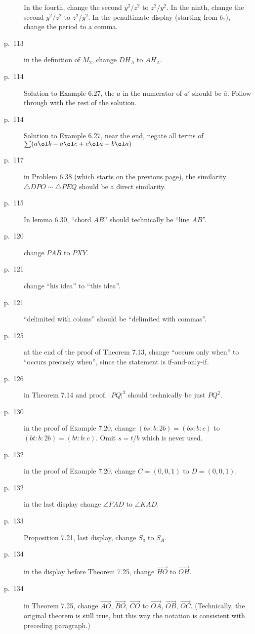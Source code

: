 \documentclass[11pt]{scrartcl}
\begin{document}
\begin{description}
  In the fourth, change the second $y^2/z^2$ to $z^2/y^2$.
  In the ninth, change the second $y^2/z^2$ to $z^2/y^2$.
  In the penultimate display (starting from $b_1$), change the period to a comma.
\item[p.\  113] in the definition of $M_2$, change $DH_A$ to $AH_A$.
\item[p.\  114] Solution to Example 6.27, the $a$ in the numerator of $a'$ should be $\bar a$.
  Follow through with the rest of the solution.
\item[p.\  114] Solution to Example 6.27, near the end, negate all terms of
  $\sum (a \ol b - a \ol c + c \ol a - b \ol a)$
\item[p.\  117] in Problem 6.38 (which starts on the previous page), the similarity
  $\triangle DPO \sim \triangle PEQ$ should be a direct similarity.
\item[p.\ 115] In lemma 6.30, ``chord $AB$'' should technically be ``line $AB$''.
\item[p.\  120] change $PAB$ to $PXY$.
\item[p.\  121] change ``his idea'' to ``this idea''.
\item[p.\  121] ``delimited with colons'' should be
  ``delimited with commas''.
\item[p.\  125] at the end of the proof of Theorem 7.13,
  change ``occurs only when'' to ``occurs precisely when'',
  since the statement is if-and-only-if.
\item[p.\  126] in Theorem 7.14 and proof, $|PQ|^2$ should technically be just $PQ^2$.
\item[p.\  130] in the proof of Example 7.20, change $(bs:b:2b)=(bs:b:c)$ to $(bt:b:2b)=(bt:b:c)$.
  Omit $s=t/b$ which is never used.
\item[p.\  132] in the proof of Example 7.20, change $C = (0, 0, 1)$ to $D = (0, 0, 1)$.
\item[p.\  132] in the last display change $\angle FAD$ to $\angle KAD$.
\item[p.\  133] Proposition 7.21, last display, change $S_a$ to $S_A$.
\item[p.\  134] in the display before Theorem 7.25,
  change $\overrightarrow{HO}$ to $\overrightarrow{OH}$.
\item[p.\  134] in Theorem 7.25, change
  $\overrightarrow{AO}$, $\overrightarrow{BO}$, $\overrightarrow{CO}$ to
  $\overrightarrow{OA}$, $\overrightarrow{OB}$, $\overrightarrow{OC}$.
  (Technically, the original theorem is still true,
  but this way the notation is consistent with preceding paragraph.)

\end{description}
\end{document}
